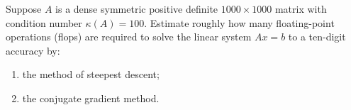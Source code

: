 \documentclass{ctexart}
\begin{document}
\begin{solution}
\begin{enumerate}
    \end{enumerate}

  \end{solution}
  \begin{problem}\label{pro:11}
    Suppose $A$ is a dense symmetric positive definite $1000 \times 1000$ matrix with
    condition number $\kappa(A) = 100$. Estimate roughly how many floating-point operations
    (flops) are required to solve the linear system $Ax = b$ to a ten-digit accuracy by:

    \begin{enumerate}[label=(\alph*)]
      \item the method of steepest descent;

      \item the conjugate gradient method.
    \end{enumerate}
  \end{problem}
\end{document}
